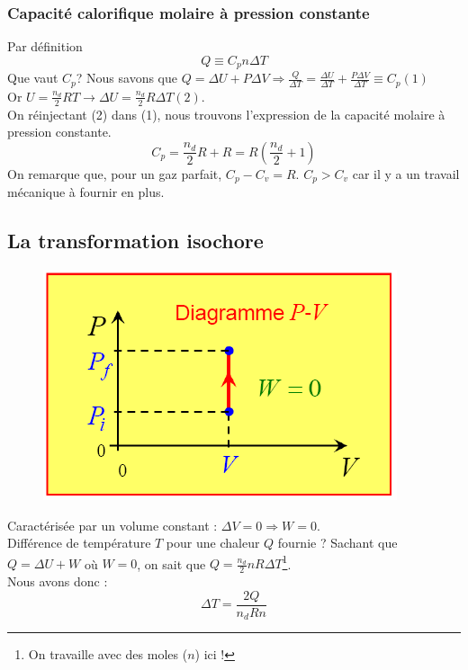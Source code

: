 \documentclass	[11pt, a4paper, openany]{book}
\begin{document}
\subsubsection{Capacité calorifique molaire à pression constante}
Par définition 
\begin{equation}
Q \equiv C_p n \Delta T
\end{equation}
Que vaut $C_p$? Nous savons que $Q = \Delta U + P\Delta V \Rightarrow \frac{Q}{\Delta T} = \frac{\Delta U}{\Delta T} + \frac{P\Delta V}{\Delta T} \equiv C_p (1)$\\
Or $U = \frac{n_d}{2}RT \rightarrow \Delta U = \frac{n_d}{2}R\Delta T (2)$.\\
On réinjectant (2) dans (1), nous trouvons l'expression de la capacité molaire à pression constante.
\begin{equation}
C_p = \frac{n_d}{2}R + R = R(\frac{n_d}{2}+1)
\end{equation}
On remarque que, pour un gaz parfait, $C_p - C_v = R$. $C_p > C_v$ car il y a un travail mécanique à fournir en plus.


\subsection{La transformation isochore}
\begin{figure}
\includegraphics[scale=0.24]{th/image11.png}
\end{figure}
Caractérisée par un volume constant : $\Delta V = 0 \Rightarrow W = 0$.\\
Différence de température $T$ pour une chaleur $Q$ fournie ? Sachant que $Q = \Delta U + W$ où $W = 0$, on sait que $Q = \frac{n_d}{2}nR\Delta T$\footnote{On travaille avec des moles ($n$) ici !}.\\Nous avons donc :
\begin{equation}
\Delta T = \frac{2Q}{n_d Rn}
\end{equation}
\end{document}
